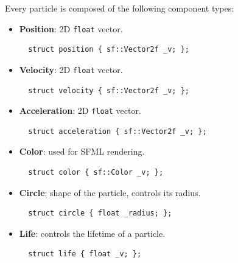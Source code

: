 \documentclass[twoside, 12pt, a4paper, openany]{book}
\begin{document}
Every particle is composed of the following component types:

\begin{itemize}
\item
  \textbf{Position}: 2D
  \texttt{float}
  vector.

  \begin{verbatim}
  struct position { sf::Vector2f _v; };
  \end{verbatim}
\item
  \textbf{Velocity}: 2D
  \texttt{float}
  vector.

  \begin{verbatim}
  struct velocity { sf::Vector2f _v; };
  \end{verbatim}
\item
  \textbf{Acceleration}: 2D
  \texttt{float}
  vector.

  \begin{verbatim}
  struct acceleration { sf::Vector2f _v; };
  \end{verbatim}
\item
  \textbf{Color}: used for SFML rendering.

  \begin{verbatim}
  struct color { sf::Color _v; };
  \end{verbatim}
\item
  \textbf{Circle}: shape of the particle, controls its radius.

  \begin{verbatim}
  struct circle { float _radius; };
  \end{verbatim}
\item
  \textbf{Life}: controls the lifetime of a particle.

  \begin{verbatim}
  struct life { float _v; };
  \end{verbatim}
\end{itemize}
\end{document}

